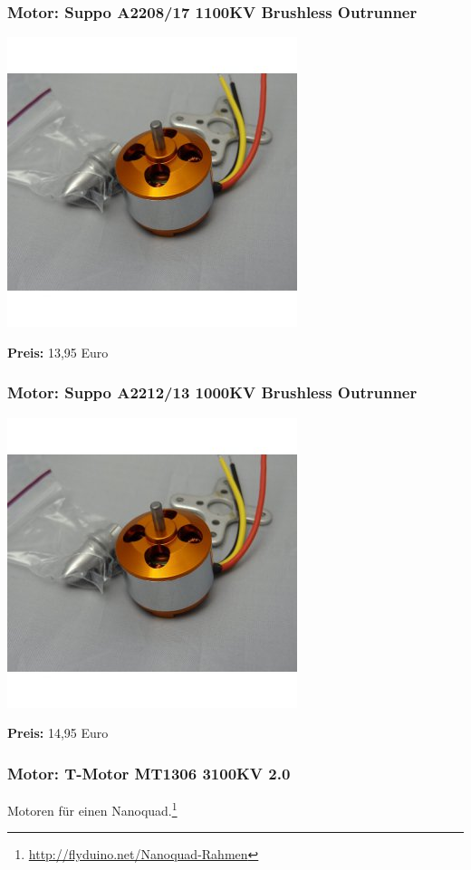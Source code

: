 \documentclass[12pt,a4paper]{article}
\begin{document}
\subsubsection*{Motor: Suppo A2208/17 1100KV Brushless Outrunner}
\includegraphics[scale=0.4]{Bilder/Suppo22082212.jpg}

\textbf{Preis:} 13,95 Euro

\subsubsection*{Motor: Suppo A2212/13 1000KV Brushless Outrunner}
\includegraphics[scale=0.4]{Bilder/Suppo22082212.jpg}

\textbf{Preis:} 14,95 Euro

\subsubsection*{Motor: T-Motor MT1306 3100KV 2.0}
Motoren für einen Nanoquad.\footnote{\url{http://flyduino.net/Nanoquad-Rahmen}}
\end{document}
